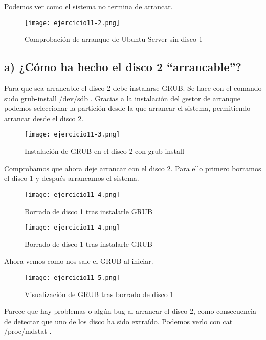 	Podemos ver como el sistema no termina de arrancar.
	
	\begin{figure}[H]
		\centering
		\texttt{[image: ejercicio11-2.png]} 
		\label{figura10} 		
		\caption{Comprobación de arranque de Ubuntu Server sin disco 1} 
	\end{figure}
	
	\subsection{a) ¿Cómo ha hecho el disco 2 “arrancable”?} 
	
	Para que sea arrancable el disco 2 debe instalarse GRUB\cite{cuarentaydos,cuarentaytres,cuarentaycuatro}. Se hace con el comando sudo grub-install /dev/sdb \cite {cuarentaycinco}. Gracias a la instalación del gestor de arranque podemos seleccionar la partición desde la que arrancar el sistema, permitiendo arrancar desde el disco 2.
	
	\begin{figure}[H]
		\centering
		\texttt{[image: ejercicio11-3.png]} 
		\label{figura11} 		
		\caption{Instalación de GRUB en el disco 2 con grub-install} 
	\end{figure}
	
	Comprobamos que ahora deje arrancar con el disco 2. Para ello primero borramos el disco 1 y después arrancamos el sistema.
	
	\begin{figure}[H]
		\centering
		\texttt{[image: ejercicio11-4.png]} 
		\label{figura12} 		
		\caption{Borrado de disco 1 tras instalarle GRUB} 
	\end{figure}
	
	\begin{figure}[H]
		\centering
		\texttt{[image: ejercicio11-4.png]} 
		\label{figura13} 		
		\caption{Borrado de disco 1 tras instalarle GRUB} 
	\end{figure}
	
	Ahora vemos como nos sale el GRUB al iniciar.
	
	\begin{figure}[H]
		\centering
		\texttt{[image: ejercicio11-5.png]} 
		\label{figura14} 		
		\caption{Visualización de GRUB tras borrado de disco 1} 
	\end{figure}
	
	Parece que hay problemas o algún bug al arrancar el disco 2, como consecuencia de detectar que uno de los disco ha sido extraído. Podemos verlo con cat /proc/mdstat \cite{cuarentaysiete}.
	
